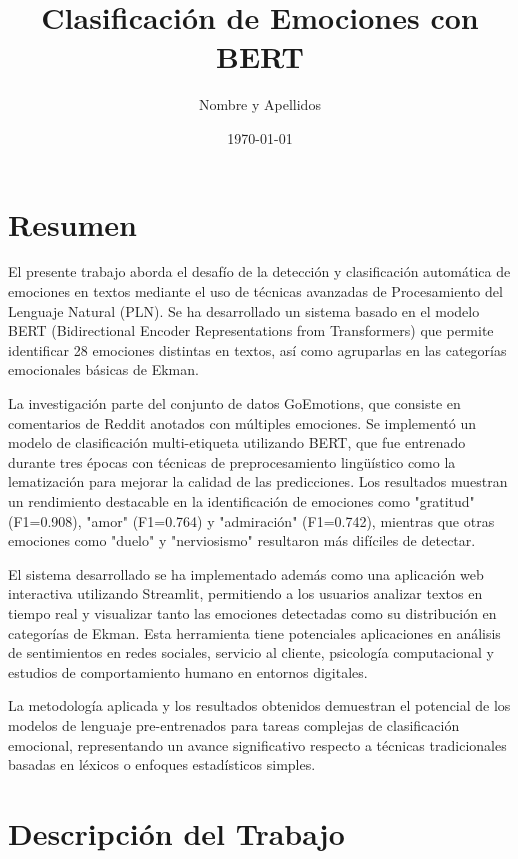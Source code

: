 \documentclass[12pt,a4paper]{report}
\title{\Huge \textbf{Clasificación de Emociones con BERT}}
\author{\Large Nombre y Apellidos}
\date{\today}
\begin{document}
\maketitle
\tableofcontents
\newpage

\chapter*{Resumen}

El presente trabajo aborda el desafío de la detección y clasificación automática de emociones en textos mediante el uso de técnicas avanzadas de Procesamiento del Lenguaje Natural (PLN). Se ha desarrollado un sistema basado en el modelo BERT (Bidirectional Encoder Representations from Transformers) que permite identificar 28 emociones distintas en textos, así como agruparlas en las categorías emocionales básicas de Ekman.

La investigación parte del conjunto de datos GoEmotions, que consiste en comentarios de Reddit anotados con múltiples emociones. Se implementó un modelo de clasificación multi-etiqueta utilizando BERT, que fue entrenado durante tres épocas con técnicas de preprocesamiento lingüístico como la lematización para mejorar la calidad de las predicciones. Los resultados muestran un rendimiento destacable en la identificación de emociones como "gratitud" (F1=0.908), "amor" (F1=0.764) y "admiración" (F1=0.742), mientras que otras emociones como "duelo" y "nerviosismo" resultaron más difíciles de detectar.

El sistema desarrollado se ha implementado además como una aplicación web interactiva utilizando Streamlit, permitiendo a los usuarios analizar textos en tiempo real y visualizar tanto las emociones detectadas como su distribución en categorías de Ekman. Esta herramienta tiene potenciales aplicaciones en análisis de sentimientos en redes sociales, servicio al cliente, psicología computacional y estudios de comportamiento humano en entornos digitales.

La metodología aplicada y los resultados obtenidos demuestran el potencial de los modelos de lenguaje pre-entrenados para tareas complejas de clasificación emocional, representando un avance significativo respecto a técnicas tradicionales basadas en léxicos o enfoques estadísticos simples.

\chapter{Descripción del Trabajo}
\end{document}
